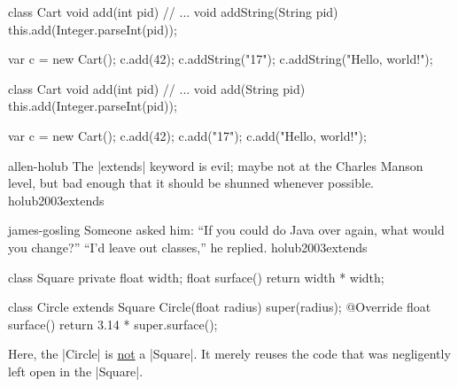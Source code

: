 \documentclass{article}
\begin{document}
\begin{pptWide}{2}
{\small\begin{ffcode}
class Cart {
  void add(int pid) // ...
  void addString(String pid) {
    this.add(Integer.parseInt(pid));
  }
}

var c = new Cart();
c.add(42);
c.addString("17");
c.addString("Hello, world!");
\end{ffcode}
}
\par\columnbreak\par
{\small\begin{ffcode}
class Cart {
  void add(int pid) // ...
  void add(String pid) {
    this.add(Integer.parseInt(pid));
  }
}

var c = new Cart();
c.add(42);
c.add("17");
c.add("Hello, world!");
\end{ffcode}
}
\end{pptWide}
\plush{}


\lnQuote
  {allen-holub}
  {The |extends| keyword is evil; maybe not at the Charles Manson level, but bad enough that it should be shunned whenever possible.}
  {holub2003extends}

\lnQuote
  {james-gosling}
  {Someone asked him: ``If you could do Java over again, what would you change?'' ``I'd leave out classes,'' he replied.}
  {holub2003extends}

\begin{pptWide}{2}
{\small\begin{ffcode}
class Square
  private float width;
  float surface()
    return width * width;

class Circle extends Square
  Circle(float radius)
    super(radius);
  @Override float surface()
    return 3.14 * super.surface();
\end{ffcode}
}
\par\columnbreak\par
{}
\par
Here, the |Circle| is \ul{not} a |Square|.
It merely reuses the code that was negligently left open in the |Square|.
\end{pptWide}
\plush{}
\end{document}
